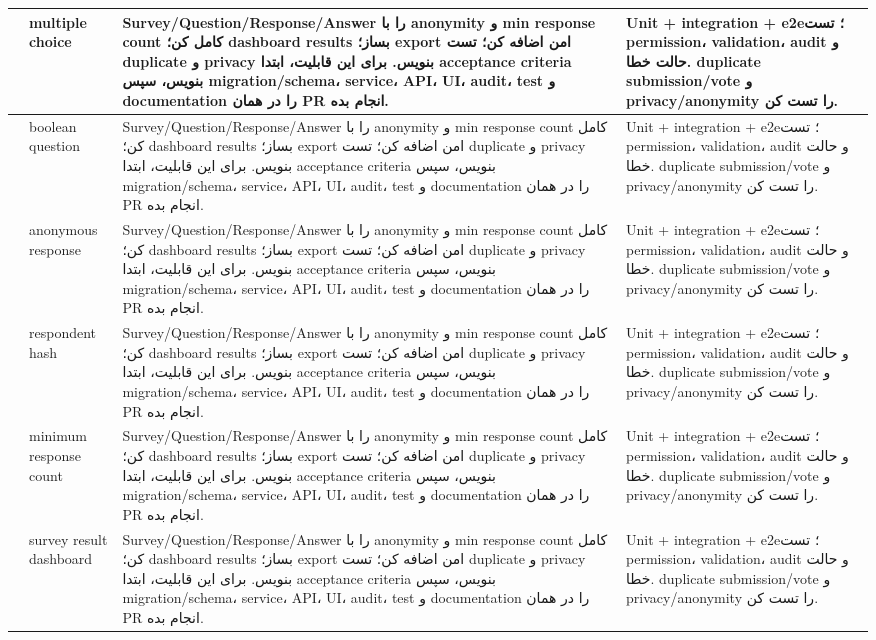 \documentclass[11pt,a4paper]{article}
\begin{document}
\begin{longtable}{|>{\raggedleft\arraybackslash}p{}|>{\raggedleft\arraybackslash}p{}|>{\raggedleft\arraybackslash}p{}|>{\raggedleft\arraybackslash}p{}|}
166 & multiple choice & Survey/Question/Response/Answer را با anonymity و min response count کامل کن؛ dashboard results بساز؛ export امن اضافه کن؛ تست duplicate و privacy بنویس. برای این قابلیت، ابتدا acceptance criteria بنویس، سپس migration/schema، service، API، UI، audit، test و documentation را در همان PR انجام بده. & Unit + integration + e2e؛ تست permission، validation، audit و حالت خطا. duplicate submission/vote و privacy/anonymity را تست کن. \\ \hline
167 & boolean question & Survey/Question/Response/Answer را با anonymity و min response count کامل کن؛ dashboard results بساز؛ export امن اضافه کن؛ تست duplicate و privacy بنویس. برای این قابلیت، ابتدا acceptance criteria بنویس، سپس migration/schema، service، API، UI، audit، test و documentation را در همان PR انجام بده. & Unit + integration + e2e؛ تست permission، validation، audit و حالت خطا. duplicate submission/vote و privacy/anonymity را تست کن. \\ \hline
168 & anonymous response & Survey/Question/Response/Answer را با anonymity و min response count کامل کن؛ dashboard results بساز؛ export امن اضافه کن؛ تست duplicate و privacy بنویس. برای این قابلیت، ابتدا acceptance criteria بنویس، سپس migration/schema، service، API، UI، audit، test و documentation را در همان PR انجام بده. & Unit + integration + e2e؛ تست permission، validation، audit و حالت خطا. duplicate submission/vote و privacy/anonymity را تست کن. \\ \hline
169 & respondent hash & Survey/Question/Response/Answer را با anonymity و min response count کامل کن؛ dashboard results بساز؛ export امن اضافه کن؛ تست duplicate و privacy بنویس. برای این قابلیت، ابتدا acceptance criteria بنویس، سپس migration/schema، service، API، UI، audit، test و documentation را در همان PR انجام بده. & Unit + integration + e2e؛ تست permission، validation، audit و حالت خطا. duplicate submission/vote و privacy/anonymity را تست کن. \\ \hline
170 & minimum response count & Survey/Question/Response/Answer را با anonymity و min response count کامل کن؛ dashboard results بساز؛ export امن اضافه کن؛ تست duplicate و privacy بنویس. برای این قابلیت، ابتدا acceptance criteria بنویس، سپس migration/schema، service، API، UI، audit، test و documentation را در همان PR انجام بده. & Unit + integration + e2e؛ تست permission، validation، audit و حالت خطا. duplicate submission/vote و privacy/anonymity را تست کن. \\ \hline
171 & survey result dashboard & Survey/Question/Response/Answer را با anonymity و min response count کامل کن؛ dashboard results بساز؛ export امن اضافه کن؛ تست duplicate و privacy بنویس. برای این قابلیت، ابتدا acceptance criteria بنویس، سپس migration/schema، service، API، UI، audit، test و documentation را در همان PR انجام بده. & Unit + integration + e2e؛ تست permission، validation، audit و حالت خطا. duplicate submission/vote و privacy/anonymity را تست کن. \\ \hline

\end{longtable}
\end{document}

